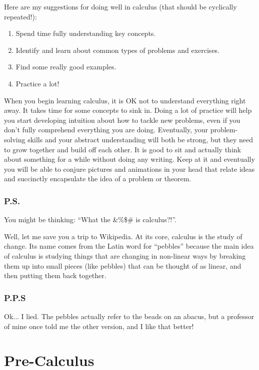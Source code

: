 \documentclass{article}
\theoremstyle{definition}
\theoremstyle{definition}
\begin{document}
Here are my suggestions for doing well in calculus (that should be cyclically repeated!):

\begin{enumerate}
\item Spend time fully understanding key concepts.
\item Identify and learn about common types of problems and exercises.
\item Find some really good examples.
\item Practice a lot!
\end{enumerate}

When you begin learning calculus, it is OK not to understand everything right away. It takes time for some concepts to sink in. Doing a lot of practice will help you start developing intuition about how to tackle new problems, even if you don't fully comprehend everything you are doing. Eventually, your problem-solving skills and your abstract understanding will both be strong, but they need to grow together and build off each other. It is good to sit and actually think about something for a while without doing any writing. Keep at it and eventually you will be able to conjure pictures and animations in your head that relate ideas and succinctly encapsulate the idea of a problem or theorem.


\section*{P.S.}
You might be thinking: ``What the \&\%\$\# is calculus?!''.

Well, let me save you a trip to Wikipedia. At its core, calculus is the study of change. Its name comes from the Latin word for ``pebbles'' because the main idea of calculus is studying things that are changing in non-linear ways by breaking them up into small pieces (like pebbles) that can be thought of as linear, and then putting them back together.

\section*{P.P.S}
Ok... I lied. The pebbles actually refer to the beads on an abacus, but a professor of mine once told me the other version, and I like that better!





\newpage
\part{Pre-Calculus}
\end{document}
